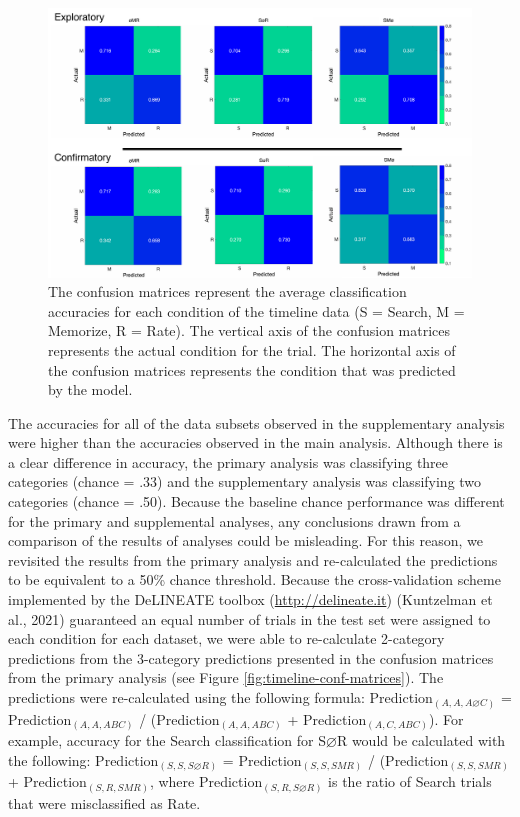 \documentclass[
  english,
  man, donotrepeattitle,floatsintext]{apa6}
\begin{document}
\begin{figure}
\centering
\includegraphics{figures/supp_analysis/confusion_matrices/supp_conf_matrices.pdf}
\caption{\label{fig:supp-conf-matrices}The confusion matrices represent the average classification accuracies for each condition of the timeline data (S = Search, M = Memorize, R = Rate). The vertical axis of the confusion matrices represents the actual condition for the trial. The horizontal axis of the confusion matrices represents the condition that was predicted by the model.}
\end{figure}

The accuracies for all of the data subsets observed in the supplementary analysis were higher than the accuracies observed in the main analysis. Although there is a clear difference in accuracy, the primary analysis was classifying three categories (chance = .33) and the supplementary analysis was classifying two categories (chance = .50). Because the baseline chance performance was different for the primary and supplemental analyses, any conclusions drawn from a comparison of the results of analyses could be misleading. For this reason, we revisited the results from the primary analysis and re-calculated the predictions to be equivalent to a 50\% chance threshold. Because the cross-validation scheme implemented by the DeLINEATE toolbox (\url{http://delineate.it}) (Kuntzelman et al., 2021) guaranteed an equal number of trials in the test set were assigned to each condition for each dataset, we were able to re-calculate 2-category predictions from the 3-category predictions presented in the confusion matrices from the primary analysis (see Figure \ref{fig:timeline-conf-matrices}). The predictions were re-calculated using the following formula: Prediction\(_{(A, A, A\varnothing C)}\) = Prediction\(_{(A, A, ABC)}\) / (Prediction\(_{(A, A, ABC)}\) + Prediction\(_{(A, C, ABC)}\)). For example, accuracy for the Search classification for S\(\varnothing\)R would be calculated with the following: Prediction\(_{(S, S, S\varnothing R)}\) = Prediction\(_{(S, S, SMR)}\) / (Prediction\(_{(S, S, SMR)}\) + Prediction\(_{(S, R, SMR)}\), where Prediction\(_{(S, R, S\varnothing R)}\) is the ratio of Search trials that were misclassified as Rate.
\end{document}

